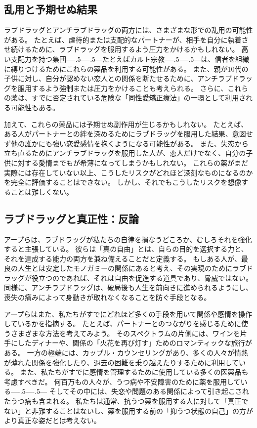 \documentclass[paper=a4,book,openany]{jlreq}
\def\DDASH{―\kern-.5\zw―\kern-.5\zw―}
\begin{document}
\subsection{乱用と予期せぬ結果}

ラブドラッグとアンチラブドラッグの両方には、さまざまな形での乱用の可能性がある。
たとえば、虐待的または支配的なパートナーが、相手を自分に執着させ続けるために、ラブドラッグを服用するよう圧力をかけるかもしれない。
高い支配力を持つ集団{\DDASH}たとえばカルト宗教{\DDASH}は、信者を組織に縛りつけるためにこれらの薬品を利用する可能性がある。
また、親が10代の子供に対し、自分が認めない恋人との関係を断たせるために、アンチラブドラッグを服用するよう強制または圧力をかけることも考えられる。
さらに、これらの薬は、すでに否定されている危険な「同性愛矯正療法」の一環として利用される可能性もある。

加えて、これらの薬品には予期せぬ副作用が生じるかもしれない。
たとえば、ある人がパートナーとの絆を深めるためにラブドラッグを服用した結果、意図せず他の誰かにも強い恋愛感情を抱くようになる可能性がある。
また、失恋から立ち直るためにアンチラブドラッグを服用した人が、恋人だけでなく、自分の子供に対する愛情までもが希薄になってしまうかもしれない。
これらの薬がまだ実際には存在していない以上、こうしたリスクがどれほど深刻なものになるのかを完全に評価することはできない。
しかし、それでもこうしたリスクを想像することは難しくない。

\subsection{ラブドラッグと真正性：反論}

アープらは、ラブドラッグが私たちの自律を損なうどころか、むしろそれを強化すると主張している。
彼らは「真の自由」とは、自らの目的を選択する力と、それを達成する能力の両方を兼ね備えることだと定義する。
もしある人が、最良の人生とは安定したモノガミーの関係にあると考え、その実現のためにラブドラッグが役立つのであれば、それは自由を促進する道具であり、脅威ではない。
同様に、アンチラブドラッグは、破局後も人生を前向きに進められるようにし、喪失の痛みによって身動きが取れなくなることを防ぐ手段となる。

アープらはまた、私たちがすでにどれほど多くの手段を用いて関係や感情を操作しているかを指摘する。
たとえば、パートナーとのつながりを感じるために使うさまざまな方法を考えてみよう。
そのスペクトラムの片側には、ワインを片手にしたディナーや、関係の「火花を再び灯す」ためのロマンティックな旅行がある。
一方の極端には、カップル・カウンセリングがあり、多くの人々が情熱が薄れた関係を強化したり、過去の困難を乗り越えたりするために利用している。
また、私たちがすでに感情を管理するために使用している多くの医薬品も考慮すべきだ。
何百万もの人々が、うつ病や不安障害のために薬を服用している{\DDASH}
そしてその中には、失恋や問題のある関係によって引き起こされたうつ病も含まれる。
私たちは通常、抗うつ薬を服用する人に対して「真正でない」と非難することはないし、薬を服用する前の「抑うつ状態の自己」の方がより真正な姿だとは考えない。
\end{document}
